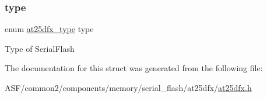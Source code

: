 \subsubsection{\texorpdfstring{type}{type}}
{\footnotesize\ttfamily enum \mbox{\hyperlink{group__asfdoc__common2__at25dfx__group_ga98ba30dd90f741beb7f8d47e7725471d}{at25dfx\+\_\+type}} type}

Type of Serial\+Flash 

The documentation for this struct was generated from the following file\+:\begin{DoxyCompactItemize}
\item 
A\+S\+F/common2/components/memory/serial\+\_\+flash/at25dfx/\mbox{\hyperlink{at25dfx_8h}{at25dfx.\+h}}\end{DoxyCompactItemize}
